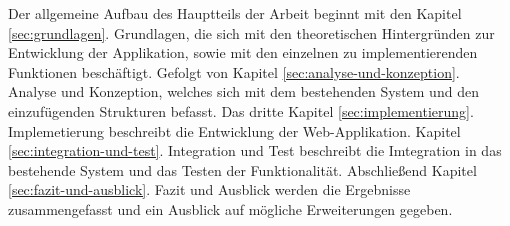 Der allgemeine Aufbau des Hauptteils der Arbeit beginnt mit den Kapitel \ref{sec:grundlagen}. Grundlagen,
die sich mit den theoretischen Hintergründen zur
Entwicklung der Applikation, sowie mit den einzelnen zu implementierenden Funktionen beschäftigt.
Gefolgt von Kapitel \ref{sec:analyse-und-konzeption}. Analyse und Konzeption, welches sich mit dem bestehenden System
und den einzufügenden Strukturen befasst.
Das dritte Kapitel \ref{sec:implementierung}. Implemetierung beschreibt die Entwicklung der Web-Applikation.
Kapitel \ref{sec:integration-und-test}. Integration und Test beschreibt die Imtegration in das bestehende System und
das Testen der Funktionalität.
Abschließend Kapitel \ref{sec:fazit-und-ausblick}. Fazit und Ausblick werden die Ergebnisse zusammengefasst
und ein Ausblick auf mögliche Erweiterungen gegeben.





